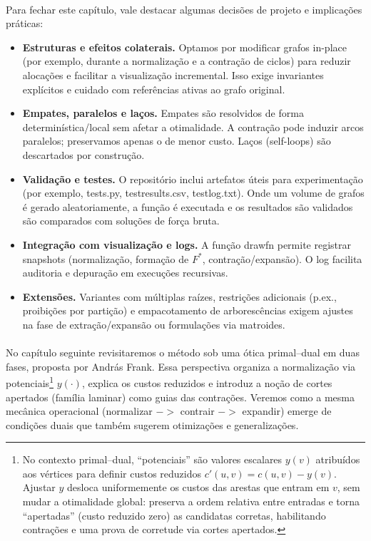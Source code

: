 \documentclass[12pt,a4paper]{article}
\def\texttt#1{#1}%
\def\emph#1{#1}%
\def\_{}%
\def\to{->}%
\begin{document}
\paragraph{}
Para fechar este capítulo, vale destacar algumas decisões de projeto e implicações práticas:
\begin{itemize}\setlength{\itemsep}{2pt}
    \item \textbf{Estruturas e efeitos colaterais.} Optamos por modificar grafos \emph{in-place} (por exemplo, durante a normalização e a contração de ciclos) para reduzir alocações e facilitar a visualização incremental. Isso exige invariantes explícitos e cuidado com referências ativas ao grafo original.
    \item \textbf{Empates, paralelos e laços.} Empates são resolvidos de forma determinística/local sem afetar a otimalidade. A contração pode induzir \emph{arcos paralelos}; preservamos apenas o de menor custo. Laços (self-loops) são descartados por construção.
    \item \textbf{Validação e testes.}  O repositório inclui artefatos úteis para experimentação (por exemplo, \texttt{tests.py}, \texttt{test\_results.csv}, \texttt{test\_log.txt}). Onde um volume de grafos é gerado aleatoriamente, a função é executada e os resultados são validados são comparados com soluções de força bruta.
    \item \textbf{Integração com visualização e logs.} A função \texttt{draw\_fn} permite registrar \emph{snapshots} (normalização, formação de \(F^*\), contração/expansão). O \texttt{log} facilita auditoria e depuração em execuções recursivas.
    \item \textbf{Extensões.} Variantes com múltiplas raízes, restrições adicionais (p.ex., proibições por partição) e empacotamento de arborescências exigem ajustes na fase de extração/expansão ou formulações via matroides.
\end{itemize}

\paragraph{}
No capítulo seguinte revisitaremos o método sob uma \emph{ótica primal–dual} em duas fases, proposta por András Frank. Essa perspectiva organiza a normalização via \emph{potenciais}\footnote{No contexto primal–dual, “potenciais” são valores escalares \(y(v)\) atribuídos aos vértices para definir \emph{custos reduzidos} \(c'(u,v)=c(u,v)-y(v)\). Ajustar \(y\) desloca uniformemente os custos das arestas que \emph{entram} em \(v\), sem mudar a otimalidade global: preserva a ordem relativa entre entradas e torna “apertadas” (custo reduzido zero) as candidatas corretas, habilitando contrações e uma prova de corretude via cortes apertados.} \(y(\cdot)\), explica os \emph{custos reduzidos} e introduz a noção de \emph{cortes apertados} (família laminar) como guias das contrações. Veremos como a mesma mecânica operacional (normalizar \(\to\) contrair \(\to\) expandir) emerge de condições duais que também sugerem otimizações e generalizações.
\end{document}
